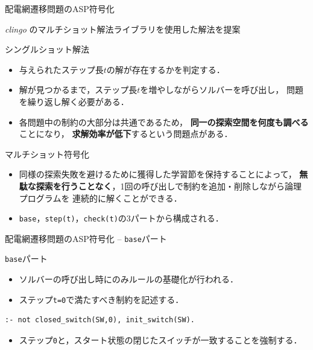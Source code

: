 \documentclass[dvipdfmx,11pt]{beamer}
\newcommand{\code}[1]{\lstinline[basicstyle=\ttfamily]{#1}}
\begin{document}
\begin{frame}{配電網遷移問題のASP符号化}
\begin{alertblock}{}
 \centering
 \textit{clingo} のマルチショット解法ライブラリを使用した解法を提案
\end{alertblock}
 \vfill
 \begin{block}{シングルショット解法}
  \begin{itemize}
   \item 与えられたステップ長$t$の解が存在するかを判定する．
   \item 解が見つかるまで，ステップ長$t$を増やしながらソルバーを呼び出し，
         問題を繰り返し解く必要がある．
   \item 各問題中の制約の大部分は共通であるため，
         \textbf{同一の探索空間を何度も調べる}ことになり，
         \textbf{求解効率が低下}するという問題点がある．
  \end{itemize}
 \end{block}
\vfill
\begin{alertblock}{マルチショット符号化}
\begin{itemize}
 \item 同様の探索失敗を避けるために獲得した学習節を保持することによって，
       \textbf{無駄な探索を行うことなく}，1回の呼び出しで制約を追加・削除しながら論理プログラムを
       連続的に解くことができる．
 \item \code{base}，\code{step(t)}，\code{check(t)}の3パートから構成される．
\end{itemize} 
\end{alertblock}
\end{frame}
\begin{frame}[fragile]{配電網遷移問題のASP符号化 -- \code{base}パート}
\begin{block}{\code{base}パート}
\begin{itemize}
 \item ソルバーの呼び出し時にのみルールの基礎化が行われる．
 \item ステップ\code{t=0}で満たすべき制約を記述する．
\end{itemize} 
\end{block}
\vfill
\begin{exampleblock}{}
\begin{lstlisting}
:- not closed_switch(SW,0), init_switch(SW).
\end{lstlisting}
\end{exampleblock}
\begin{itemize}
 \item ステップ\code{0}と，スタート状態の閉じたスイッチが一致することを強制する．
\end{itemize}
\end{frame}
\end{document}
